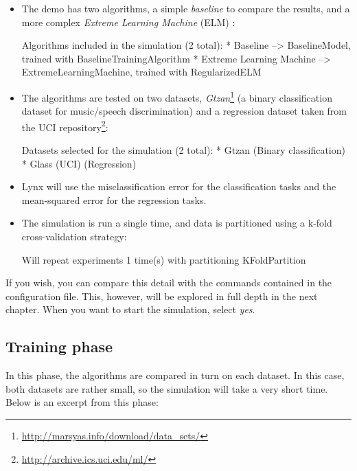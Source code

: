 \begin{itemize}
\item The demo has two algorithms, a simple \textit{baseline} to compare the results, and a more complex \textit{Extreme Learning Machine} (ELM) \cite{Huang2012}:

\begin{console}
Algorithms included in the simulation (2 total):
  * Baseline 
    --> BaselineModel, trained with BaselineTrainingAlgorithm
  * Extreme Learning Machine 
    --> ExtremeLearningMachine, trained with RegularizedELM
\end{console}

\item The algorithms are tested on two datasets, \textit{Gtzan}\footnote{\url{http://marsyas.info/download/data_sets/}} (a binary classification dataset for music/speech discrimination) and a regression dataset taken from the UCI repository\footnote{\url{http://archive.ics.uci.edu/ml/}}:

\begin{console}
Datasets selected for the simulation (2 total):
  * Gtzan (Binary classification)
  * Glass (UCI) (Regression)
\end{console}

\item Lynx will use the misclassification error for the classification tasks and the mean-squared error for the regression tasks.
\item The simulation is run a single time, and data is partitioned using a k-fold cross-validation strategy:

\begin{console}
Will repeat experiments 1 time(s) with partitioning KFoldPartition
\end{console}

\end{itemize}

\noindent If you wish, you can compare this detail with the commands contained in the configuration file. This, however, will be explored in full depth in the next chapter. When you want to start the simulation, select \textit{yes}.

\subsection{Training phase}

In this phase, the algorithms are compared in turn on each dataset. In this case, both datasets are rather small, so the simulation will take a very short time. Below is an excerpt from this phase:

